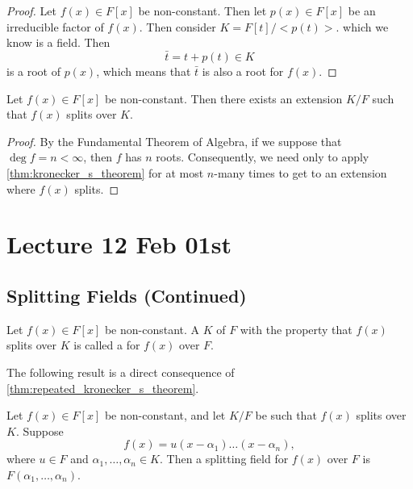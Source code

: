 \documentclass[notoc,notitlepage]{tufte-book}
\begin{document}
\begin{proof}
  Let $f(x) \in F[x]$ be non-constant. Then let $p(x) \in F[x]$ be an irreducible factor of
  $f(x)$. Then consider $K = F[t] / <p(t)>$. which we know is a field. Then
  \begin{equation*}
    \bar{t} = t + p(t) \in K
  \end{equation*}
  is a root of $p(x)$, which means that $\bar{t}$ is also a root for $f(x)$.
\end{proof}

\begin{thm}\label{thm:repeated_kronecker_s_theorem}
  Let $f(x) \in F[x]$ be non-constant. Then there exists an extension $K / F$ such that
  $f(x)$ splits over $K$.
\end{thm}

\begin{proof}
  By the Fundamental Theorem of Algebra, if we suppose that $\deg f = n < \infty$, then
  $f$ has $n$ roots. Consequently, we need only to apply \cref{thm:kronecker_s_theorem}
  for at most $n$-many times to get to an extension where $f(x)$ splits.
\end{proof}



\chapter{Lecture 12 Feb 01st}%
\label{chp:lecture_12_feb_01st}

\section{Splitting Fields (Continued)}%
\label{sec:splitting_fields_continued}

\begin{defn}\label{defn:splitting_field}
  Let $f(x) \in F[x]$ be non-constant. A  $K$ of $F$ with the
  property that $f(x)$ splits over $K$ is called a  for $f(x)$
  over $F$.
\end{defn}

The following result is a direct consequence of \cref{thm:repeated_kronecker_s_theorem}.

\begin{propo}\label{propo:a_splitting_field_is_generated}
  Let $f(x) \in F[x]$ be non-constant, and let $K / F$ be such that $f(x)$ splits over $K$.
  Suppose
  \begin{equation*}
    f(x) = u(x - \alpha_1) \hdots (x - \alpha_n),
  \end{equation*}
  where $u \in F$ and $\alpha_1, \ldots, \alpha_n \in K$. Then a splitting field for $f(x)$
  over $F$ is $F(\alpha_1, \ldots, \alpha_n)$.
\end{propo}
\end{document}
